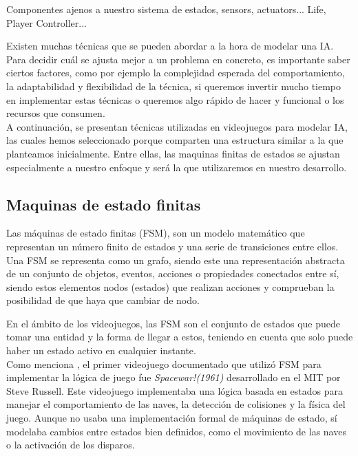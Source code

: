 Componentes ajenos a nuestro sistema de estados, sensors, actuators...
Life, Player Controller...


Existen muchas técnicas que se pueden abordar a la hora de modelar una IA. Para decidir cuál se ajusta mejor a un problema en concreto, es importante saber ciertos factores, como por ejemplo la complejidad esperada del comportamiento, la adaptabilidad y flexibilidad de la técnica, si queremos invertir mucho tiempo en implementar estas técnicas o queremos algo rápido de hacer y funcional o los recursos que consumen. \\
A continuación, se presentan técnicas utilizadas en videojuegos para modelar IA, las cuales hemos seleccionado porque comparten una estructura similar a la que planteamos inicialmente. Entre ellas, las maquinas finitas de estados se ajustan especialmente a nuestro enfoque y será la que utilizaremos en nuestro desarrollo.
\subsection{Maquinas de estado finitas}
Las máquinas de estado finitas (FSM), son un modelo matemático que representan un número finito de estados y una serie de transiciones entre ellos. \\

Una FSM se representa como un grafo, siendo este una representación abstracta de un conjunto de objetos, eventos, acciones o propiedades conectados entre sí, siendo estos elementos nodos (estados) que realizan acciones y comprueban la posibilidad de que haya que cambiar de nodo. 

En el ámbito de los videojuegos, las FSM son el conjunto de estados que puede tomar una entidad y la forma de llegar a estos, teniendo en cuenta que solo puede haber un estado activo en cualquier instante. \\

Como menciona \citet{FSM_Article}, el primer videojuego documentado que utilizó FSM para implementar la lógica de juego fue \textit{Spacewar!(1961)} desarrollado en el MIT por Steve Russell. Este videojuego implementaba una lógica basada en estados para manejar el comportamiento de las naves, la detección de colisiones y la física del juego. Aunque no usaba una implementación formal de máquinas de estado, sí modelaba cambios entre estados bien definidos, como el movimiento de las naves o la activación de los disparos. \\ 


